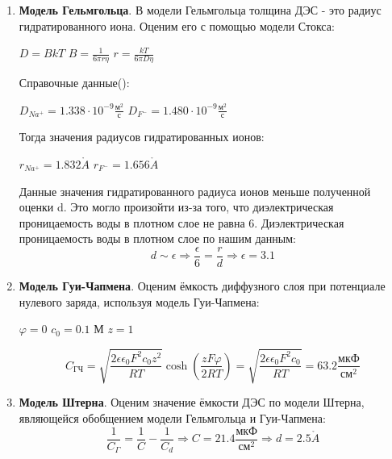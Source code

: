 \documentclass[a4paper,12pt]{article}
\renewcommand{\AA}{\ensuremath{\mathring{A}}}
\begin{document}
\begin{enumerate}
\item \textbf{Модель Гельмгольца}. В модели Гельмгольца толщина ДЭС - это радиус гидратированного иона. Оценим его с помощью модели Стокса:
\begin{center}
    $D = BkT$ \hspace{1cm} $B = \frac{1}{6 \pi r \eta}$ \hspace{1cm} $r = \frac{kT}{6 \pi D \eta}$
\end{center}

Справочные данные(\cite{2}):
\begin{center}
        $D_{Na^{+}} = 1.338\cdot 10^{-9} \frac{\text{м}^{2}}{\text{с}}$ \hspace{1cm} $D_{F^{-}} = 1.480\cdot 10^{-9} \frac{\text{м}^{2}}{\text{с}}$
    \end{center}
Тогда значения радиусов гидратированных ионов:
\begin{center}
    $r_{Na^{+}} = 1.832\AA$ \hspace{1cm} $r_{F^{-}} = 1.656\AA$
\end{center}
Данные значения гидратированного радиуса ионов меньше полученной оценки d. Это могло произойти из-за того, что диэлектрическая проницаемость воды в плотном слое не равна 6. Диэлектрическая проницаемость воды в плотном слое по нашим данным: 
\begin{equation*}
    d \sim \epsilon \Rightarrow \frac{\epsilon}{6} = \frac{r}{d} \Rightarrow \epsilon = 3.1
\end{equation*}

\item \textbf{Модель Гуи-Чапмена}. Оценим ёмкость диффузного слоя при потенциале нулевого заряда, используя модель Гуи-Чапмена: 
\begin{center}
    $\varphi = 0$ \hspace{1cm} $c_0 = 0.1 \text{ М}$ \hspace{1cm} $z = 1$
\end{center}

\[
C_{\text{ГЧ}} = \sqrt{\frac{2\epsilon \epsilon_0 F^2 c_{0}z^{2}}{RT}}\cosh(\frac{zF\varphi}{2RT}) =  \sqrt{\frac{2\epsilon \epsilon_0 F^2 c_{0}}{RT}} = 63.2 \frac{\text{мкФ}}{\text{см}^{2}}
\]
\item \textbf{Модель Штерна}. Оценим значение ёмкости ДЭС по модели Штерна, являющейся обобщением модели Гельмгольца и Гуи-Чапмена:
\begin{equation*}
    \frac{1}{C_{\Gamma}} = \frac{1}{C} - \frac{1}{C_d} \Rightarrow C = 21.4 \frac{\text{мкФ}}{\text{см}^2} \Rightarrow d = 2.5 \AA
\end{equation*}

\end{enumerate}
\end{document}
